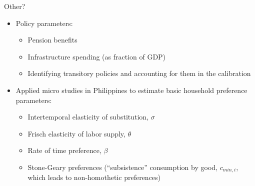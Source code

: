 \documentclass{beamer}
\begin{document}
  \begin{frame}{Other?}
    \begin{itemize}
      \item Policy parameters:
        \begin{itemize}
          \item Pension benefits
          \item Infrastructure spending (as fraction of GDP)
          \item Identifying transitory policies and accounting for them in the calibration
        \end{itemize}
      \item Applied micro studies in Philippines to estimate basic household preference parameters:
        \begin{itemize}
          \item Intertemporal elasticity of substitution, $\sigma$
          \item Frisch elasticity of labor supply, $\theta$
          \item Rate of time preference, $\beta$
          \item Stone-Geary preferences (``subsistence'' consumption by good, $c_{min, i}$, which leads to non-homothetic preferences)
        \end{itemize}
    \end{itemize}
    \end{frame}
\end{document}
